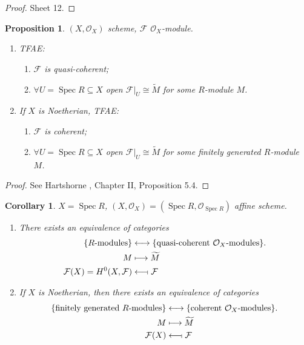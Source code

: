 \documentclass[12pt]{article}
\DeclareMathOperator{\Spec}{Spec}
\newtheorem*{proposition}{Proposition}
\newtheorem*{corollary}{Corollary}
\theoremstyle{definition}
\begin{document}
\begin{proof}
Sheet 12.
\end{proof}


\begin{proposition}
$(X,\mathcal{O}_X)$ scheme, $\mathcal{F}$ $\mathcal{O}_X$-module.

\begin{enumerate}[label=\roman*)]
\item TFAE:
\begin{enumerate}[label=\arabic*)]
\item $\mathcal{F}$ is quasi-coherent;
\item $\forall U=\Spec R\subseteq X$ open $\mathcal{F}|_U\cong\widetilde{M}$ for some $R$-module $M$.
\end{enumerate}

\item If $X$ is Noetherian, TFAE:
\begin{enumerate}[label=\arabic*)]
\item $\mathcal{F}$ is coherent;
\item $\forall U=\Spec R\subseteq X$ open $\mathcal{F}|_U\cong\widetilde{M}$ for some finitely generated $R$-module $M$.
\end{enumerate}
\end{enumerate}
\end{proposition}

\begin{proof}
See Hartshorne \cite{hartshorne2013algebraic}, Chapter II, Proposition 5.4.
\end{proof}

\begin{corollary}
$X=\Spec R$, $(X,\mathcal{O}_X)=(\Spec R,\mathcal{O}_{\Spec R})$ affine scheme.

\begin{enumerate}[label=\arabic*)]
\item There exists an equivalence of categories
\begin{align*}
\{R\text{-modules}\}&\longleftrightarrow\{\text{quasi-coherent }\mathcal{O}_X\text{-modules}\}.\\
M&\longmapsto\widetilde{M}\\
\mathcal{F}(X)=H^0(X,\mathcal{F})&\longleftarrow\!\shortmid\mathcal{F}
\end{align*}

\item If $X$ is Noetherian, then there exists an equivalence of categories
\begin{align*}
\{\text{finitely generated }R\text{-modules}\}&\longleftrightarrow\{\text{coherent }\mathcal{O}_X\text{-modules}\}.\\
M&\longmapsto\widetilde{M}\\
\mathcal{F}(X)&\longleftarrow\!\shortmid\mathcal{F}
\end{align*}
\end{enumerate}
\end{corollary}
\end{document}
